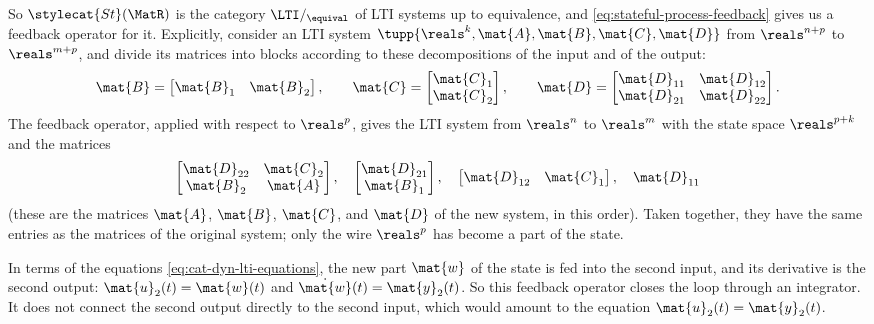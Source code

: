 So $\stylecat{St}(\MatR)$ is the category $\LTI/_{\equival}$ of LTI systems up to equivalence, and \cref{eq:stateful-process-feedback} gives us a feedback operator for it.
Explicitly, consider an LTI system $\tupp{\reals^k, \mat{A}, \mat{B}, \mat{C}, \mat{D}}$ from $\reals^{n+p}$ to $\reals^{m+p}$, and divide its matrices into blocks according to these decompositions of the input and of the output:
\begin{equation}
    \mat{B} = \begin{bmatrix} \mat{B}_1 & \mat{B}_2 \end{bmatrix},
    \qquad
    \mat{C} = \begin{bmatrix} \mat{C}_1 \\ \mat{C}_2 \end{bmatrix},
    \qquad
    \mat{D} = \begin{bmatrix} \mat{D}_{11} & \mat{D}_{12} \\ \mat{D}_{21} & \mat{D}_{22} \end{bmatrix}.
\end{equation}
The feedback operator, applied with respect to $\reals^p$, gives the LTI system from $\reals^n$ to $\reals^m$ with the state space $\reals^{p+k}$ and the matrices
\begin{equation}
    \label{eq:lti-feedback}
    \begin{bmatrix} \mat{D}_{22} & \mat{C}_2 \\ \mat{B}_2 & \mat{A} \end{bmatrix},
    \quad
    \begin{bmatrix} \mat{D}_{21} \\ \mat{B}_1 \end{bmatrix},
    \quad
    \begin{bmatrix} \mat{D}_{12} & \mat{C}_1 \end{bmatrix},
    \quad
    \mat{D}_{11}
\end{equation}
(these are the matrices $\mat{A}$, $\mat{B}$, $\mat{C}$, and $\mat{D}$ of the new system, in this order).
Taken together, they have the same entries as the matrices of the original system; only the wire $\reals^p$ has become a part of the state.

In terms of the equations \cref{eq:cat-dyn-lti-equations}, the new part $\mat{w}$ of the state is fed into the second input, and its derivative is the second output: $\mat{u}_2(t) = \mat{w}(t)$ and $\dot{\mat{w}}(t) = \mat{y}_2(t)$.
So this feedback operator closes the loop through an integrator.
It does not connect the second output directly to the second input, which would amount to the equation $\mat{u}_2(t) = \mat{y}_2(t)$.

